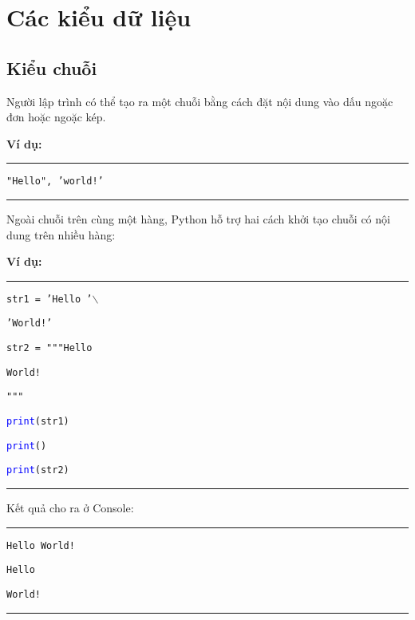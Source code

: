 \section{Các kiểu dữ liệu}
\subsection{Kiểu chuỗi}
Người lập trình có thể tạo ra một chuỗi bằng cách đặt nội dung vào dấu ngoặc đơn hoặc ngoặc kép.\par
\noindent
\textbf{Ví dụ:}\\
\rule{\linewidth}{0.2mm}\par
	\texttt{"Hello", 'world!'}\\
\rule{\linewidth}{0.2mm}\par
\noindent
Ngoài chuỗi trên cùng một hàng, Python hỗ trợ hai cách khởi tạo chuỗi có nội dung trên nhiều hàng:\par
\textbf{Ví dụ:}\\
\rule{\linewidth}{0.2mm}\par
\begin{linenumbers}
	\texttt{str1 = 'Hello '$\backslash$}\par
	\qquad\texttt{'World!'}\par
	\texttt{str2 = """Hello}\par
	\texttt{World!}\par
	\texttt{"""}\par
	\texttt{\textcolor{blue}{print}(str1)}\par
	\texttt{\textcolor{blue}{print}()}\par
	\texttt{\textcolor{blue}{print}(str2)}\par
\end{linenumbers}
\rule{\linewidth}{0.2mm}\par
\noindent
\resetlinenumber
Kết quả cho ra ở Console:\\
\rule{\linewidth}{0.2mm}\par
\begin{linenumbers}
	\texttt{Hello World!}\par
	\texttt{}\par
	\texttt{Hello}\par
	\texttt{World!}
\end{linenumbers}
\rule{\linewidth}{0.2mm}\par
\resetlinenumber
\newpage
